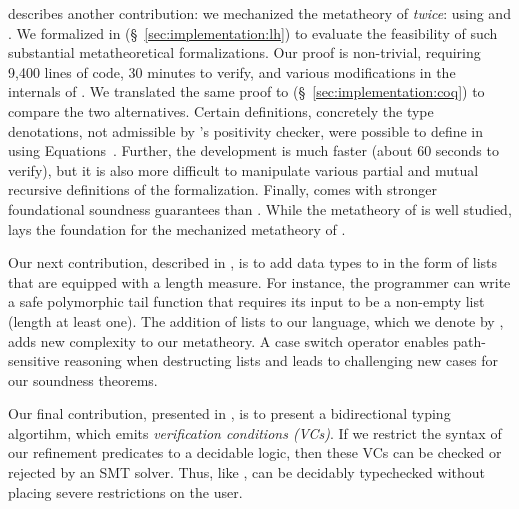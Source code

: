 %
 describes another contribution:
we mechanized the metatheory
of \sysrf \emph{twice}: using \lh and \coq.
%
We formalized \sysrf in \lh (\S~\ref{sec:implementation:lh}) %
to evaluate the feasibility of such
substantial metatheoretical formalizations.
%
Our proof is non-trivial, requiring 9,400 lines
of code, 30 minutes to verify, and various modifications
in the  internals of \lh.
%
We translated the same proof 
to \coq (\S~\ref{sec:implementation:coq})             %
to compare the two alternatives.
%
Certain definitions, concretely the type denotations,
not admissible by \lh's positivity checker,
were possible to define in \coq using Equations~\cite{10.1145/3341690}.
%
Further, the \coq development is
much faster (about 60 seconds to verify),
but it is also more difficult to manipulate various
partial and mutual recursive definitions of the formalization.
%
Finally, \coq comes with stronger foundational
soundness guarantees than \lh.
%
While the metatheory of \coq is well studied,
\sysrf lays the foundation for the mechanized metatheory of \lh.

%

%
Our next contribution,
described in ,
is to add data types to \sysrf in the form of
lists that are equipped with a length measure.
%
For instance, the programmer can write a safe polymorphic 
tail function that requires its input to be a non-empty
list (length at least one).
%
The addition of lists to our language, which we denote
by \sysrfd,
adds new complexity to our metatheory.
%
A case switch operator enables path-sensitive reasoning when
destructing lists and leads to challenging new cases for our
soundness theorems.

%
Our final contribution,
presented in ,
is to present a bidirectional typing algortihm, which emits
\emph{verification conditions (VCs)}. If we restrict the syntax
of our refinement predicates to a decidable logic, then these VCs 
can be checked or rejected by an SMT solver. Thus, like \lh,
\sysrfd can be decidably typechecked without placing severe 
restrictions on the user. 
